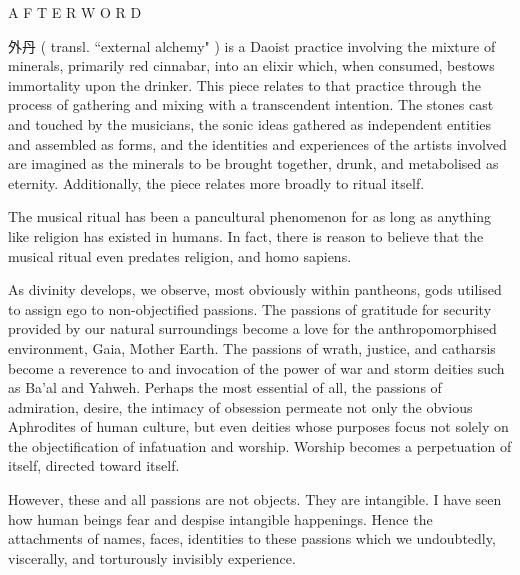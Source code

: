 \documentclass[12pt]{article}
\begin{document}
\begingroup
\begin{center}
\end{center}
\endgroup

\vspace{11\baselineskip}

\begingroup
\begin{center}
\huge A F T E R W O R D
\end{center}
\endgroup

\vspace{3\baselineskip}

\begingroup
\hspace{4mm} {\setmainfont{Source Han Serif SC}\selectfont 外丹} ( transl. ``external alchemy" ) is a Daoist practice involving the mixture of minerals, primarily red cinnabar, into an elixir which, when consumed, bestows immortality upon the drinker. This piece relates to that practice through the process of gathering and mixing with a transcendent intention. The stones cast and touched by the musicians, the sonic ideas gathered as independent entities and assembled as forms, and the identities and experiences of the artists involved are imagined as the minerals to be brought together, drunk, and metabolised as eternity. Additionally, the piece relates more broadly to ritual itself. 

\endgroup
\begingroup
\hspace{4mm} The musical ritual has been a pancultural phenomenon for as long as anything like religion has existed in humans. In fact, there is reason to believe that the musical ritual even predates religion, and homo sapiens.
\endgroup

\begingroup
\hspace{4mm} As divinity develops, we observe, most obviously within pantheons, gods utilised to assign ego to non-objectified passions. The passions of gratitude for security provided by our natural surroundings become a love for the anthropomorphised environment, Gaia, Mother Earth. The passions of wrath, justice, and catharsis become a reverence to and invocation of the power of war and storm deities such as Ba'al and Yahweh. Perhaps the most essential of all, the passions of admiration, desire, the intimacy of obsession permeate not only the obvious Aphrodites of human culture, but even deities whose purposes focus not solely on the objectification of infatuation and worship. Worship becomes a perpetuation of itself, directed toward itself. 
\endgroup

\begingroup
\hspace{4mm} However, these and all passions are not objects. They are intangible. I have seen how human beings fear and despise intangible happenings. Hence the attachments of names, faces, identities to these passions which we undoubtedly, viscerally, and torturously invisibly experience. 
\endgroup
\end{document}
